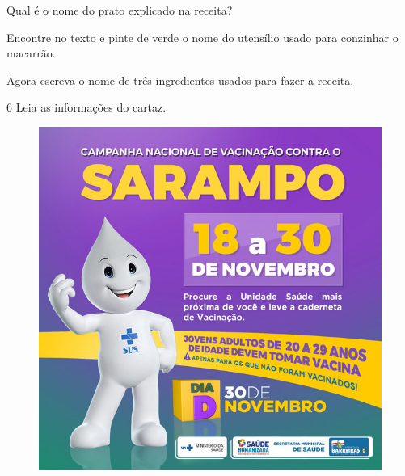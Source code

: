 
\begin{escolha}
\item Qual é o nome do prato explicado na receita?\\

\item Encontre no texto e pinte de verde o nome do utensílio usado para
conzinhar o macarrão.\\

\item Agora escreva o nome de três ingredientes usados para fazer a receita.\\
\end{escolha}

\num{6} Leia as informações do cartaz.


\begin{figure}[H]
\centering
\includegraphics[width=.7\textwidth]{media/image85.jpeg}
\end{figure}

